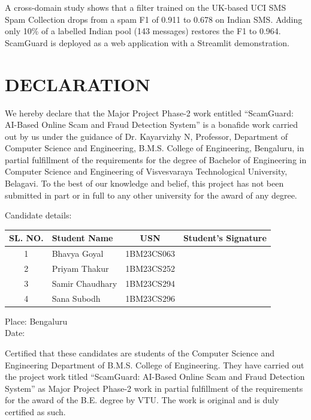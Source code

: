 A cross-domain study shows that a filter trained on the UK-based UCI SMS Spam Collection drops from a spam F1 of 0.911 to 0.678 on Indian SMS. Adding only 10\% of a labelled Indian pool (143 messages) restores the F1 to 0.964. ScamGuard is deployed as a web application with a Streamlit demonstration.
\clearpage

\chapter*{\centering DECLARATION}
We hereby declare that the Major Project Phase-2 work entitled ``ScamGuard: AI-Based Online Scam and Fraud Detection System'' is a bonafide work carried out by us under the guidance of Dr. Kayarvizhy N, Professor, Department of Computer Science and Engineering, B.M.S. College of Engineering, Bengaluru, in partial fulfillment of the requirements for the degree of Bachelor of Engineering in Computer Science and Engineering of Visvesvaraya Technological University, Belagavi. To the best of our knowledge and belief, this project has not been submitted in part or in full to any other university for the award of any degree.

\vspace{0.3cm}\noindent Candidate details:
\vspace{0.2cm}
\begin{center}
\begin{tabular}{|c|l|c|c|}
\hline
\textbf{SL. NO.} & \textbf{Student Name} & \textbf{USN} & \textbf{Student's Signature} \\
\hline
1 & Bhavya Goyal & 1BM23CS063 & \hspace{3cm} \\[0.35cm]
\hline
2 & Priyam Thakur & 1BM23CS252 & \\[0.35cm]
\hline
3 & Samir Chaudhary & 1BM23CS294 & \\[0.35cm]
\hline
4 & Sana Subodh & 1BM23CS296 & \\[0.35cm]
\hline
\end{tabular}
\end{center}
\noindent Place: Bengaluru\\
Date:

\vspace{0.3cm}
Certified that these candidates are students of the Computer Science and Engineering Department of B.M.S. College of Engineering. They have carried out the project work titled ``ScamGuard: AI-Based Online Scam and Fraud Detection System'' as Major Project Phase-2 work in partial fulfillment of the requirements for the award of the B.E. degree by VTU. The work is original and is duly certified as such.

